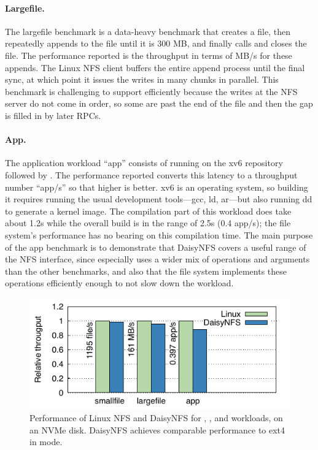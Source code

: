 \paragraph{Largefile.}
The largefile benchmark is a data-heavy benchmark that creates a file, then
repeatedly appends to the file until it is 300 MB, and finally calls
 and closes the file. The performance reported is the throughput in
terms of MB/s for these appends. The Linux NFS client buffers the entire append
process until the final sync, at which point it issues the writes in many chunks
in parallel. This benchmark is challenging to support efficiently because the
writes at the NFS server do not come in order, so some are past the end of the
file and then the gap is filled in by later RPCs.

\paragraph{App.}
The application workload ``app'' consists of running  on the xv6
repository followed by . The performance reported converts this latency
to a throughput number ``app/s'' so that higher is better. xv6 is an operating
system, so building it requires running the usual development tools---gcc, ld,
ar---but also running dd to generate a kernel image. The compilation part of
this workload does take about 1.2s while the overall build is in the range of
2.5s (0.4 app/s); the file system's performance has no bearing on this
compilation time. The main purpose of the app benchmark is to demonstrate that
DaisyNFS covers a useful range of the NFS interface, since 
especially uses a wider mix of operations and arguments than the other
benchmarks, and also that the file system implements these operations
efficiently enough to not slow down the workload.



\begin{figure}[ht]
  \includegraphics{daisy-nfs/fig/bench.pdf}
  \caption[Performance for smallfile, largefile, and app benchmarks]%
  {Performance of Linux NFS and DaisyNFS for ,
    , and  workloads, on an NVMe disk.
    DaisyNFS achieves comparable performance to ext4 in  mode.}
  \label{fig:eval:bench}
\end{figure}

